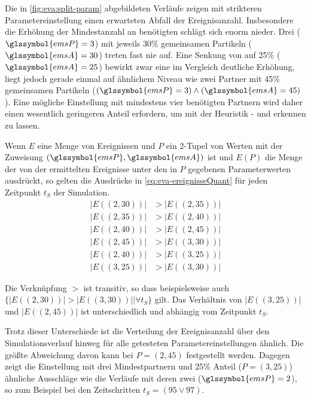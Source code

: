 Die in \autoref{fig:eva:split-param} abgebildeten Verläufe zeigen mit strikteren Parametereinstellung einen erwarteten Abfall der Ereignisanzahl. Insbesondere die Erhöhung der Mindestanzahl an benötigten   schlägt sich enorm nieder. Drei  ($\glssymbol{emsP} = 3$) mit jeweils 30\% gemeinsamen Partikeln ($\glssymbol{emsA} = 30$) treten fast nie auf. Eine Senkung von  auf 25\% ($\glssymbol{emsA} = 25$) bewirkt zwar eine im Vergleich deutliche Erhöhung, liegt jedoch gerade einmal auf ähnlichem Niveau wie zwei Partner mit 45\% gemeinsamen Partikeln ($(\glssymbol{emsP} = 3) \land (\glssymbol{emsA} = 45)$). Eine mögliche Einstellung mit mindestens vier benötigten Partnern wird daher einen wesentlich geringeren Anteil erfordern, um mit der Heuristik - und  erkennen zu lassen.

Wenn $E$ eine Menge von Ereignissen und $P$ ein 2-Tupel von Werten mit der Zuweisung $(\glssymbol{emsP}, \glssymbol{emsA})$ ist und $E(P)$ die Menge der von der  ermittelten Ereignisse unter den in $P$ gegebenen Parameterwerten ausdrückt, so gelten die Ausdrücke in \autoref{eq:eva-ereignisseQuant} für jeden Zeitpunkt $t_S$ der Simulation.
\begin{equation}
	\begin{aligned}\label{eq:eva-ereignisseQuant}
		|E((2, 30))| &> |E((2, 35))|\\
		|E((2, 35))| &> |E((2, 40))|\\
		|E((2, 40))| &> |E((2, 45))|\\
		|E((2, 45))| &> |E((3, 30))|\\
		|E((2, 40))| &> |E((3, 25))|\\
		|E((3, 25))| &> |E((3, 30))|
	\end{aligned}
\end{equation}

Die Verknüpfung $>$ ist transitiv, so dass beispielsweise auch $\{|E((2, 30))| > |E((3, 30))| | \forall t_S\}$ gilt. Das Verhältnis von $|E((3, 25))|$ und $|E((2, 45))|$ ist unterschiedlich und abhängig vom Zeitpunkt $t_S$.

Trotz dieser Unterschiede ist die Verteilung der Ereignisanzahl über den Simulationsverlauf hinweg für alle getesteten Parametereinstellungen ähnlich. Die größte Abweichung davon kann bei $P = (2, 45)$ festgestellt werden. Dagegen zeigt die Einstellung mit drei Mindestpartnern und 25\% Anteil ($P = (3, 25)$) ähnliche Ausschläge wie die Verläufe mit deren zwei ($\glssymbol{emsP} = 2$), so zum Beispiel bei den Zeitschritten $t_S = (95 \lor 97)$.

